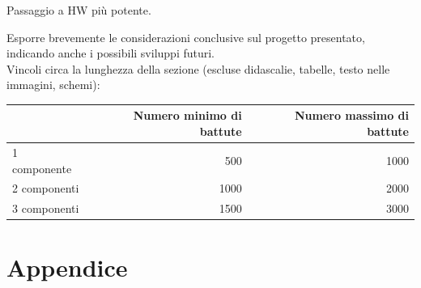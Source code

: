 \documentclass[12pt]{article}
\begin{document}
Passaggio a HW più potente.

Esporre brevemente le considerazioni conclusive sul progetto presentato, indicando anche i possibili sviluppi futuri.\\

Vincoli circa la lunghezza della sezione (escluse didascalie, tabelle, testo nelle immagini, schemi):

\vspace{1cm}
\begin{tabular}{l|rr}
 & Numero minimo di battute & Numero massimo di battute \\
 \hline
 1 componente & 500 & 1000 \\
 2 componenti & 1000 & 2000 \\
 3 componenti & 1500 & 3000 \\
 \hline
\end{tabular}

\newpage



\appendix
{}
\section*{Appendice}
\end{document}
